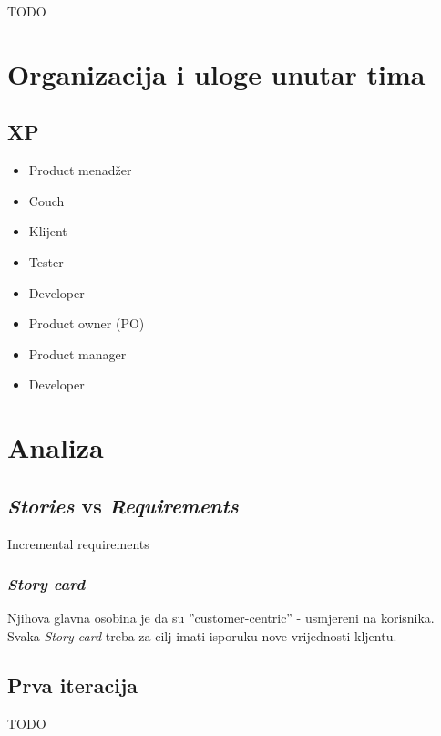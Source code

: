 \documentclass[lmodern, utf8, zavrsni]{fit}
\begin{document}
TODO

\chapter{Organizacija i uloge unutar tima}

\section{XP}

\begin{itemize}

  \item{Product menadžer}
  \item{Couch}
  \item{Klijent}
  \item{Tester}
  \item{Developer}

\end{itemize}

\begin{itemize}
    \item Product owner (PO)
    \item Product manager
    \item Developer
\end{itemize}

\chapter{Analiza}

\section{\emph{Stories} vs \emph{Requirements}}

Incremental requirements 

\subsection{\emph{Story card}}

Njihova glavna osobina je da su ''customer-centric'' - usmjereni na korisnika. 
Svaka \emph{Story card} treba za cilj imati isporuku nove vrijednosti kljentu.


\section{Prva iteracija}

TODO
\end{document}
